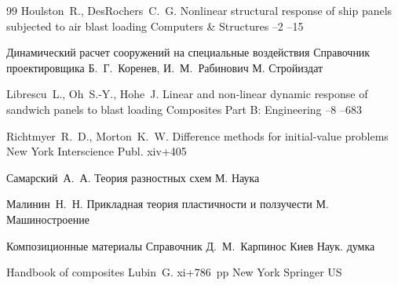 \begin{thebibliography}{99}
\by Houlston~R., DesRochers~C.~G.
\paper Nonlinear structural response of ship panels subjected to air blast loading
\jour Computers {\&} Structures
--2
--15

\book Динамический расчет сооружений на специальные воздействия
\bookinfo Справочник проектировщика
\ed Б.~Г.~Коренев, И.~М.~Рабинович
\publaddr М.
\publ Стройиздат

\by Librescu~L., Oh~S.-Y., Hohe~J.
\paper Linear and non-linear dynamic response of sandwich panels to blast loading
\jour  Composites Part B: Engineering 
--8
--683

\by Richtmyer~R.~D., Morton~K.~W.
\book Difference methods for initial-value problems
\publaddr New York
\publ Interscience Publ.
\totalpages  xiv+405

\by Самарский~А.~А.
\book Теория разностных схем
\publaddr М.
\publ Наука

\by Малинин~Н.~Н.
\book Прикладная теория пластичности и ползучести
\publaddr М.
\publ Машиностроение

\book Композиционные материалы
\bookinfo  Справочник
\ed Д.~М.~Карпинос
\publaddr Киев
\publ Наук. думка

\book Handbook of composites
\by Lubin~G. 
\totalpages xi+786~pp \nofrills
{}
\publaddr New York
\publ Springer US

\end{thebibliography}

\newpage

\makeentitle




